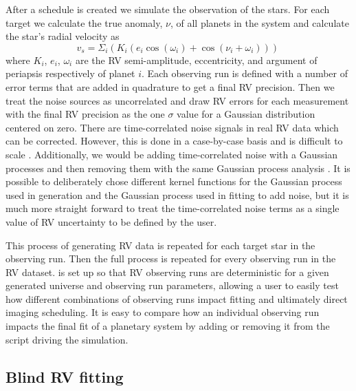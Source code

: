 After a schedule is created we simulate the observation of the stars. For each
target we calculate the true anomaly, $\nu$, of all planets in the system and
calculate the star's radial velocity as 
\begin{equation}
v_s = \Sigma_i \left(K_i \left(e_i
\cos(\omega_i) + \cos(\nu_i + \omega_i)\right)\right) \,
  \label{eq:system_rv}
\end{equation}
where $K_i$, $e_i$,
$\omega_i$ are the RV semi-amplitude, eccentricity, and argument of periapsis
respectively of planet $i$. Each observing run is defined with a number of
error terms that are added in quadrature to get a final RV precision. Then we
treat the noise sources as uncorrelated and draw RV errors for each measurement
with the final RV precision as the one $\sigma$ value for a Gaussian
distribution centered on zero. There are time-correlated noise signals in real
RV data which can be corrected. However, this is done in a case-by-case basis
and is difficult to scale \citep{guptaTargetPrioritization2021}. Additionally,
we would be adding time-correlated noise with a Gaussian processes and then
removing them with the same Gaussian process analysis
\citep{aigrainGaussianProcess2022}. It is possible to deliberately chose
different kernel functions for the Gaussian process used in generation and the
Gaussian process used in fitting to add noise, but it is much more straight
forward to treat the time-correlated noise terms as a single value of RV
uncertainty to be defined by the user.

This process of generating RV data is repeated for each target star in the
observing run. Then the full process is repeated for every observing run in the
RV dataset.  is set up so that RV observing runs are deterministic
for a given generated universe and observing run parameters, allowing a user to
easily test how different combinations of observing runs impact fitting and
ultimately direct imaging scheduling. It is easy to compare how an individual
observing run impacts the final fit of a planetary system by adding or removing
it from the script driving the simulation.

\subsection{Blind RV fitting}

